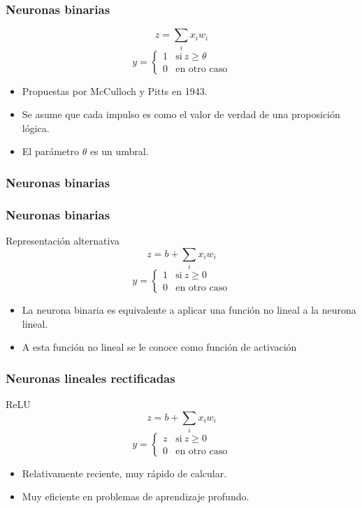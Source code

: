\documentclass{beamer}
\begin{document}
\begin{frame}
  \frametitle{Neuronas binarias}
  \begin{block}{}
      $$ z = \sum_{i} x_i w_i $$
      $$ y = \left\{
          \begin{array}{ll}
            1 & \text{si}\ z \ge \theta \\
            0 & \text{en otro caso}
          \end{array} \right. $$
  \end{block}

  \begin{itemize}
  \item Propuestas por McCulloch y Pitts en 1943.
  \item Se asume que cada impulso es como el valor de verdad de una
    proposición lógica.
  \item El parámetro $\theta$ es un umbral.
  \end{itemize}
\end{frame}

\begin{frame}
  \frametitle{Neuronas binarias}

  \frametitle{Neuronas binarias}
  \begin{block}{Representación alternativa}
      $$ z = b + \sum_{i} x_i w_i $$
      $$ y = \left\{
          \begin{array}{ll}
            1 & \text{si}\ z \ge 0 \\
            0 & \text{en otro caso}
          \end{array} \right. $$
  \end{block}

  \begin{itemize}
  \item La neurona binaria es equivalente a aplicar una función no
    lineal a la neurona lineal.
  \item A esta función no lineal se le conoce como \alert{función de activación}
  \end{itemize}
\end{frame}

\begin{frame}
 \frametitle{Neuronas lineales rectificadas}
  \begin{block}{ReLU}
      $$ z = b + \sum_{i} x_i w_i $$
      $$ y = \left\{
          \begin{array}{ll}
            z & \text{si}\ z \ge 0 \\
            0 & \text{en otro caso}
          \end{array} \right. $$
  \end{block}
  
  \begin{itemize}
  \item Relativamente reciente, muy rápido de calcular.
  \item Muy eficiente en problemas de aprendizaje profundo.
  \end{itemize}
\end{frame}
\end{document}
